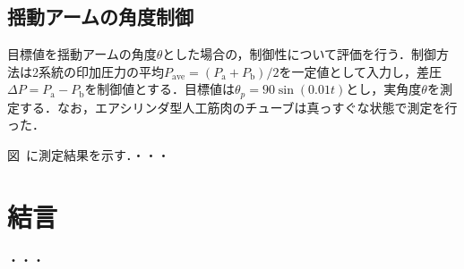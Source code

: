 \subsection{揺動アームの角度制御}
目標値を揺動アームの角度$\theta$とした場合の，制御性について評価を行う．制御方法は2系統の印加圧力の平均$P_\mathrm{ave}=(P_\mathrm{a} + P_\mathrm{b})/2$を一定値として入力し，差圧$\Delta P = P_\mathrm{a} - P_\mathrm{b}$を制御値とする．目標値は$\theta_p = 90 \sin(0.01t)$とし，実角度$\theta$を測定する．なお，エアシリンダ型人工筋肉のチューブは真っすぐな状態で測定を行った．
\par
図~に測定結果を示す．・・・
\section{結言}%
・・・